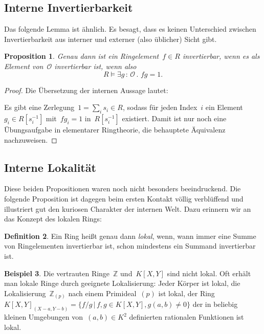\documentclass[a4paper,ngerman,12pt]{scrartcl}
\theoremstyle{definition}
\newtheorem{defn}{Definition}[section]
\newtheorem{bsp}[defn]{Beispiel}
\theoremstyle{plain}
\newtheorem{prop}[defn]{Proposition}
\theoremstyle{remark}
\newcommand{\ZZ}{\mathbb{Z}}
\renewcommand{\O}{\mathcal{O}}
\renewcommand{\_}{\mathpunct{.}\,}
\newcommand{\?}{\,{:}\,}
\newenvironment{indentblock}{%
  \list{}{\leftmargin\leftmargin}%
  \item\relax
}{%
  \endlist
}
\begin{document}
\subsection{Interne Invertierbarkeit}

Das folgende Lemma ist ähnlich. Es besagt, dass es keinen Unterschied zwischen
Invertierbarkeit aus interner und externer (also üblicher) Sicht gibt.
\begin{prop}\label{interne-invertierbarkeit}%
Genau dann ist ein Ringelement~$f \in R$ invertierbar, wenn es als Element
von~$\O$ invertierbar ist, wenn also
\[ R \models \exists g\?\O\_ fg = 1. \]
\end{prop}
\begin{proof}
Die Übersetzung der internen Aussage lautet:
\begin{indentblock}
Es gibt eine Zerlegung~$1 = \sum_i s_i \in R$, sodass für jeden Index~$i$ ein
Element~$g_i \in R[s_i^{-1}]$ mit~$fg_i = 1$ in~$R[s_i^{-1}]$ existiert.
\end{indentblock}
Damit ist nur noch eine Übungsaufgabe in elementarer Ringtheorie, die
behauptete Äquivalenz nachzuweisen.
\end{proof}


\subsection{Interne Lokalität}

Diese beiden Propositionen waren noch nicht besonders beeindruckend.
Die folgende Proposition ist dagegen beim ersten Kontakt völlig verblüffend und
illustriert gut den kuriosen Charakter der internen Welt. Dazu erinnern wir an
das Konzept des lokalen Rings:
\begin{defn}Ein Ring heißt genau dann \emph{lokal}, wenn, wann immer eine Summe
von Ringelementen invertierbar ist, schon mindestens ein Summand invertierbar
ist.\end{defn}
\begin{bsp}Die vertrauten Ringe~$\ZZ$ und~$K[X,Y]$ sind nicht lokal. Oft erhält
man lokale Ringe durch geeignete Lokalisierung: Jeder Körper ist lokal,
die Lokalisierung~$\ZZ_{(p)}$ nach einem Primideal~$(p)$ ist lokal, der Ring
$K[X,Y]_{(X-a,Y-b)} = \{ f/g \,|\, f,g \in K[X,Y], g(a,b) \neq 0 \}$ der in
beliebig kleinen Umgebungen von~$(a,b) \in K^2$ definierten rationalen
Funktionen ist lokal.
\end{bsp}
\end{document}
